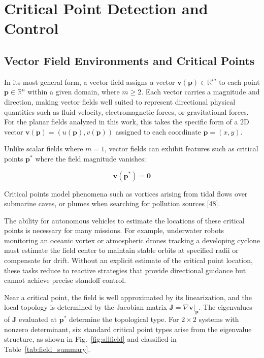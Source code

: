 \documentclass[lettersize,journal]{IEEEtran}
\begin{document}
\section{Critical Point Detection and Control}

\subsection{Vector Field Environments and Critical Points}

In its most general form, a vector field assigns a vector $\mathbf{v}(\mathbf{p}) \in \mathbb{R}^m$ to each point $\mathbf{p} \in \mathbb{R}^n$ within a given domain, where $m \geq 2$. Each vector carries a magnitude and direction, making vector fields well suited to represent directional physical quantities such as fluid velocity, electromagnetic forces, or gravitational forces. For the planar fields analyzed in this work, this takes the specific form of a 2D vector $\mathbf{v}(\mathbf{p}) = (u(\mathbf{p}), v(\mathbf{p}))$ assigned to each coordinate $\mathbf{p} = (x, y)$.

Unlike scalar fields where $m=1$, vector fields can exhibit features such as critical points $\mathbf{p}^*$ where the field magnitude vanishes:

\begin{equation}
\mathbf{v}(\mathbf{p}^*) = \mathbf{0}
\end{equation}

Critical points model phenomena such as vortices arising from tidal flows over submarine caves, or plumes when searching for pollution sources [48].

The ability for autonomous vehicles to estimate the locations of these critical points is necessary for many missions. For example, underwater robots monitoring an oceanic vortex or atmospheric drones tracking a developing cyclone must estimate the field center to maintain stable orbits at specified radii or compensate for drift. Without an explicit estimate of the critical point location, these tasks reduce to reactive strategies that provide directional guidance but cannot achieve precise standoff control.

Near a critical point, the field is well approximated by its linearization, and the local topology is determined by the Jacobian matrix $\mathbf{J} = \nabla\mathbf{v}|_{\mathbf{p}}$. The eigenvalues of $\mathbf{J}$ evaluated at $\mathbf{p}^*$ determine the topological type. For $2 \times 2$ systems with nonzero determinant, six standard critical point types arise from the eigenvalue structure, as shown in Fig.~\ref{fig:allfield} and classified in Table~\ref{tab:field_summary}.
\end{document}
